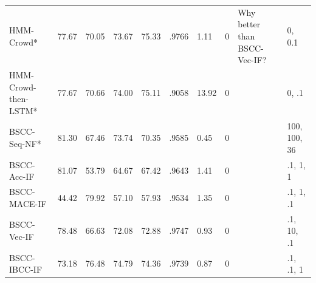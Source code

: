 \begin{table}
\begin{tabularx}{\textwidth}{| l | X | X | X | X | X | X | X | X | X |}
HMM-Crowd* & 77.67 & 70.05 & 73.67 & 75.33 & .9766 & 1.11 & 0 & Why better than BSCC-Vec-IF? & 0, 0.1 \\ %
HMM-Crowd-then-LSTM* & 77.67 & 70.66 & 74.00 & 75.11 & .9058 & 13.92 & 0 & & 0, .1\\  \hline
BSCC-Seq-NF* & 81.30 & 67.46 & 73.74 & 70.35 & .9585 & 0.45 & 0 & & 100, 100, 36\\ \hline
BSCC-Acc-IF & 81.07 & 53.79 & 64.67 & 67.42 & .9643 & 1.41 & 0 & & .1, 1, 1 \\
BSCC-MACE-IF & 44.42 & 79.92 & 57.10 & 57.93 & .9534 & 1.35 & 0 &  & .1, 1, .1\\
BSCC-Vec-IF & 78.48 & 66.63 & 72.08 & 72.88 & .9747 & 0.93 & 0 &  &  .1, 10, .1\\
BSCC-IBCC-IF & 73.18 & 76.48 & 74.79 & 74.36 & .9739 & 0.87 & 0 &  & .1, .1, 1\\

\end{tabularx}
\end{table}
